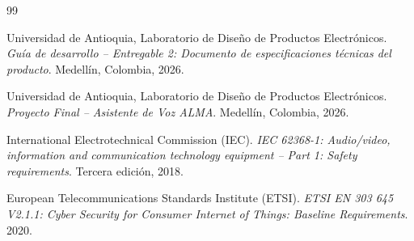 \documentclass[%
	paper=a4,
	twoside=false,
	parskip=half,
	chapterprefix=false,
	10pt,
	headings=normal,
	bibliography=totoc,
	listof=totoc,
	titlepage=on,
	captions=tableabove,
	draft=false, 
]{scrbook}%
\begin{document}
\begin{thebibliography}{99}

Universidad de Antioquia, Laboratorio de Diseño de Productos Electrónicos. \textit{Guía de desarrollo -- Entregable 2: Documento de especificaciones técnicas del producto}. Medellín, Colombia, 2026.

Universidad de Antioquia, Laboratorio de Diseño de Productos Electrónicos. \textit{Proyecto Final -- Asistente de Voz ALMA}. Medellín, Colombia, 2026.

International Electrotechnical Commission (IEC). \textit{IEC 62368-1: Audio/video, information and communication technology equipment -- Part 1: Safety requirements}. Tercera edición, 2018.

European Telecommunications Standards Institute (ETSI). \textit{ETSI EN 303 645 V2.1.1: Cyber Security for Consumer Internet of Things: Baseline Requirements}. 2020.

\end{thebibliography}
\end{document}
